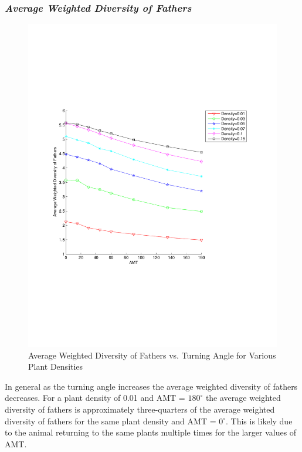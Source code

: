\documentclass[preprint,12pt]{elsarticle}
\numberwithin{equation}{subsection}
\begin{document}
\subsubsection*{\emph{Average Weighted Diversity of Fathers}}
\begin{figure}
  \begin{center}
  \includegraphics[width=1.0\textwidth]{WDFvsAMT.pdf}
  \end{center}
  \caption{\small Average Weighted Diversity of Fathers vs. Turning Angle for
Various Plant Densities}
  \label{EFathers}
\end{figure}
In general as the turning angle increases the average weighted diversity of
fathers decreases. For a plant density of 0.01 and AMT = $180^\circ$ the average
weighted diversity of fathers is approximately three-quarters of the average
weighted diversity of fathers for the same plant density and AMT = $0^\circ$. This
is likely due to the animal returning to the same plants multiple times for the
larger values of AMT.
\end{document}
